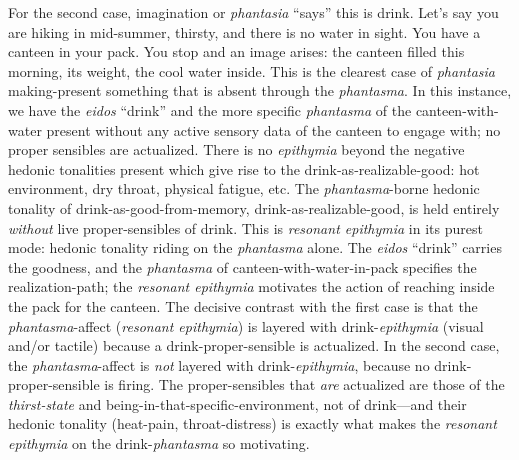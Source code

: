 \documentclass{article}
\begin{document}
For the second case, imagination or \textit{phantasia} ``says'' this is drink. Let's say you are hiking in mid-summer, thirsty, and there is no water in sight. You have a canteen in your pack. You stop and an image arises: the canteen filled this morning, its weight, the cool water inside. This is the clearest case of \textit{phantasia} making-present something that is absent through the \textit{phantasma}. In this instance, we have the \textit{eidos} ``drink'' and the more specific \textit{phantasma} of the canteen-with-water present without any active sensory data of the canteen to engage with; no proper sensibles are actualized. There is no \textit{epithymia} beyond the negative hedonic tonalities present which give rise to the drink-as-realizable-good: hot environment, dry throat, physical fatigue, etc. The \textit{phantasma}-borne hedonic tonality of drink-as-good-from-memory, drink-as-realizable-good, is held entirely \textit{without} live proper-sensibles of drink. This is \textit{resonant epithymia} in its purest mode: hedonic tonality riding on the \textit{phantasma} alone. The \textit{eidos} ``drink'' carries the goodness, and the \textit{phantasma} of canteen-with-water-in-pack specifies the realization-path; the \textit{resonant epithymia} motivates the action of reaching inside the pack for the canteen. The decisive contrast with the first case is that the \textit{phantasma}-affect (\textit{resonant epithymia}) is layered with drink-\textit{epithymia} (visual and/or tactile) because a drink-proper-sensible is actualized. In the second case, the \textit{phantasma}-affect is \textit{not} layered with drink-\textit{epithymia}, because no drink-proper-sensible is firing. The proper-sensibles that \textit{are} actualized are those of the \textit{thirst-state} and being-in-that-specific-environment, not of drink---and their hedonic tonality (heat-pain, throat-distress) is exactly what makes the \textit{resonant epithymia} on the drink-\textit{phantasma} so motivating. 
\end{document}
